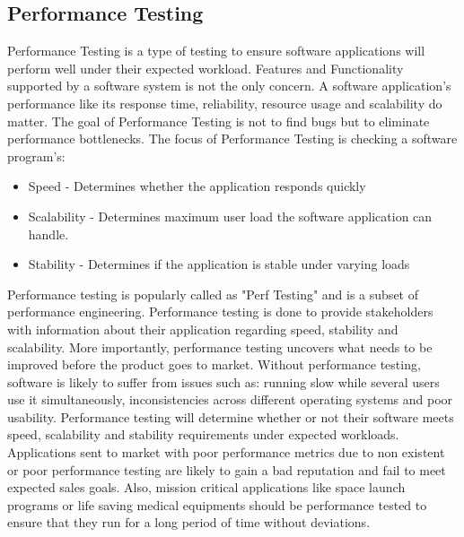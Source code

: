 \documentclass[../thesis.tex]{subfiles}
\begin{document}
\subsection{Performance Testing}
Performance Testing is a type of testing to ensure software applications will perform well under their expected workload. Features and Functionality supported by a software system is not the only concern. A software application's performance like its response time, reliability, resource usage and scalability do matter. The goal of Performance Testing is not to find bugs but to eliminate performance bottlenecks.
\vspace{5mm}
The focus of Performance Testing is checking a software program's:
\vspace{5mm}
\begin{itemize}
\item Speed - Determines whether the application responds quickly
\vspace{5mm}
\item Scalability - Determines maximum user load the software application can handle.
\vspace{5mm}
\item Stability - Determines if the application is stable under varying loads
\end{itemize}
\vspace{5mm}
Performance testing is popularly called as "Perf Testing" and is a subset of performance engineering. Performance testing is done to provide stakeholders with information about their application regarding speed, stability and scalability. More importantly, performance testing uncovers what needs to be improved before the product goes to market. Without performance testing, software is likely to suffer from issues such as: running slow while several users use it simultaneously, inconsistencies across different operating systems and poor usability. Performance testing will determine whether or not their software meets speed, scalability and stability requirements under expected workloads. Applications sent to market with poor performance metrics due to non existent or poor performance testing are likely to gain a bad reputation and fail to meet expected sales goals. Also, mission critical applications like space launch programs or life saving medical equipments should be performance tested to ensure that they run for a long period of time without deviations.
\end{document}
